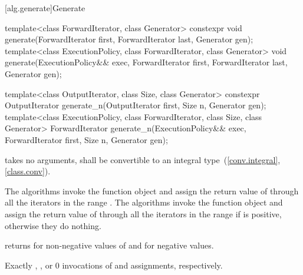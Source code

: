 [alg.generate]{Generate}

%
%
\begin{itemdecl}
template<class ForwardIterator, class Generator>
  constexpr void generate(ForwardIterator first, ForwardIterator last,
                          Generator gen);
template<class ExecutionPolicy, class ForwardIterator, class Generator>
  void generate(ExecutionPolicy&& exec,
                ForwardIterator first, ForwardIterator last,
                Generator gen);

template<class OutputIterator, class Size, class Generator>
  constexpr OutputIterator generate_n(OutputIterator first, Size n, Generator gen);
template<class ExecutionPolicy, class ForwardIterator, class Size, class Generator>
  ForwardIterator generate_n(ExecutionPolicy&& exec,
                             ForwardIterator first, Size n, Generator gen);
\end{itemdecl}

\begin{itemdescr}
\pnum
\requires
{} takes no arguments,
shall be convertible to an integral type~(\ref{conv.integral}, \ref{class.conv}).

\pnum
\effects
The  algorithms invoke the function object  and assign the return
value of  through all the iterators in the range
. The  algorithms invoke the function object
 and assign the return value of  through all the iterators in
the range  if  is positive,
otherwise they do nothing.

\pnum
\returns {} returns  for non-negative values of 
and  for negative values.

\pnum
\complexity
Exactly
,
, or 0
invocations of  and assignments, respectively.
\end{itemdescr}

